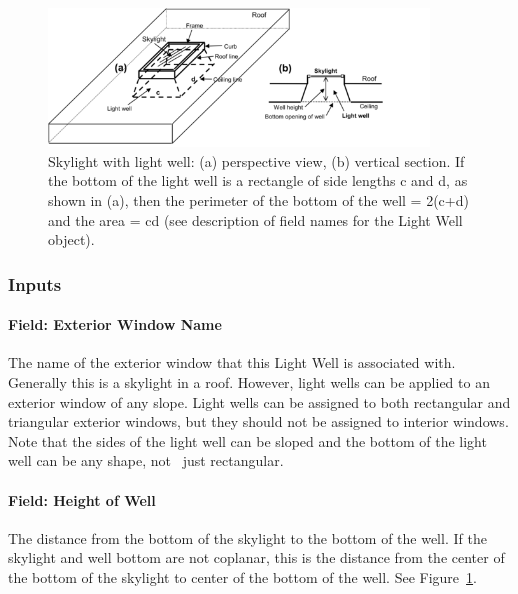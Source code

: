 \begin{figure}[hbtp] %
\centering
\includegraphics[width=0.9\textwidth, height=0.9\textheight, keepaspectratio=true]{media/image112.png}
\caption{Skylight with light well: (a) perspective view, (b) vertical section. If the bottom of the light well is a rectangle of side lengths c and d, as shown in (a), then the perimeter of the bottom of the well = 2(c+d) and the area = cd (see description of field names for the Light Well object). \protect \label{fig:skylight-with-light-well-a-perspective-view-b}}
\end{figure}

\subsubsection{Inputs}\label{inputs-8-004}

\paragraph{Field: Exterior Window Name}\label{field-exterior-window-name}

The name of the exterior window that this Light Well is associated with. Generally this is a skylight in a roof. However, light wells can be applied to an exterior window of any slope. Light wells can be assigned to both rectangular and triangular exterior windows, but they should not be assigned to interior windows. Note that the sides of the light well can be sloped and the bottom of the light well can be any shape, not~ just rectangular.

\paragraph{Field: Height of Well}\label{field-height-of-well}

The distance from the bottom of the skylight to the bottom of the well. If the skylight and well bottom are not coplanar, this is the distance from the center of the bottom of the skylight to center of the bottom of the well. See Figure~\ref{fig:skylight-with-light-well-a-perspective-view-b}.

